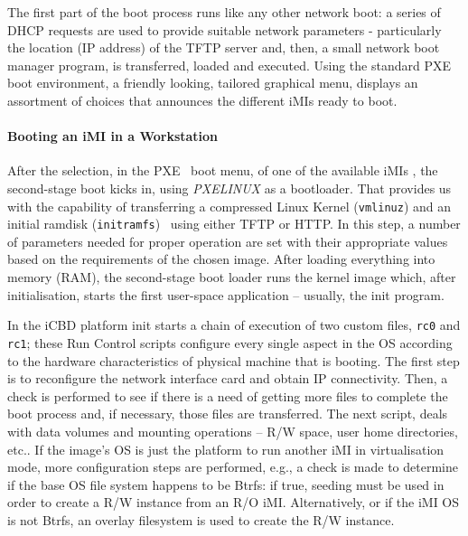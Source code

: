 The first part of the boot process runs like any other network boot: a series of DHCP requests are used to provide suitable network parameters - particularly the location (IP address) of the TFTP server and, then, a small network boot manager program, is transferred, loaded and executed. Using the standard PXE boot environment, a friendly looking, tailored graphical menu, displays an assortment of choices that announces the different iMIs ready to boot.

\paragraph{Booting an iMI in a Workstation}
\label{subsub:icbd_booting_imi}

After the selection, in the PXE~\cite{ibm_linux_boot} boot menu, of one of the available iMIs , the second-stage boot kicks in, using \textit{PXELINUX} as a bootloader. That provides us with the capability of transferring a compressed Linux Kernel (\texttt{vmlinuz}) and an initial ramdisk (\texttt{initramfs})~\cite{ibm_initrd} using either TFTP or HTTP. In this step, a number of parameters needed for proper operation are set with their appropriate values based on the requirements of the chosen image. After loading everything into memory (RAM), the second-stage boot loader runs the kernel image which, after initialisation, starts the first user-space application – usually, the init program.

In the iCBD platform init starts a chain of execution of two custom files, \texttt{rc0} and \texttt{rc1}; these Run Control scripts configure every single aspect in the OS according to the hardware characteristics of physical machine that is booting. The first step is to reconfigure the network interface card and obtain IP connectivity. Then, a check is performed to see if there is a need of getting more files to complete the boot process and, if necessary, those files are transferred. The next script, deals with data volumes and mounting operations – R/W space, user home directories, etc.. If the image’s OS is just the platform to run another iMI in virtualisation mode, more configuration steps are performed, e.g., a check is made to determine if the base OS file system happens to be Btrfs: if true, seeding must be used in order to create a R/W instance from an R/O iMI. Alternatively, or if the iMI OS is not Btrfs, an overlay filesystem is used to create the R/W instance.

